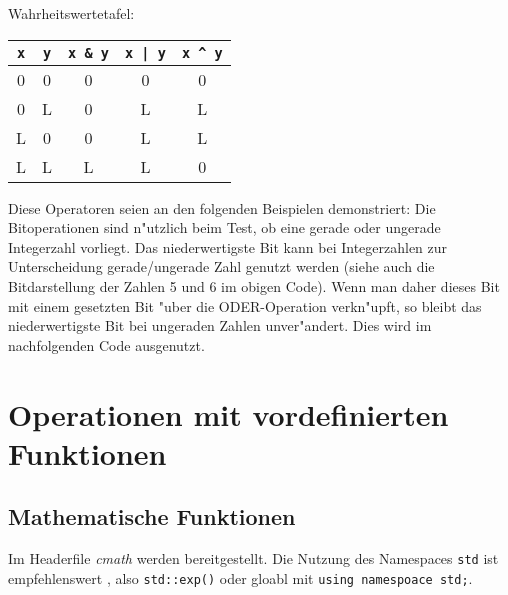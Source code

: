 Wahrheitswertetafel:
\begin{tabular}[t]{c|c||c|c|c}
  \verb|x| & \verb|y| & \verb|x & y| & \verb!x | y! & \verb|x ^ y| \\ \hline
  0 & 0 & 0 & 0 & 0 \\
  0 & L & 0 & L & L \\
  L & 0 & 0 & L & L \\
  L & L & L & L & 0
\end{tabular}

Diese Operatoren seien an den folgenden Beispielen demonstriert:
%
%
Die Bitoperationen sind n"utzlich beim Test, ob eine gerade oder ungerade
Integerzahl vorliegt. Das niederwertigste Bit kann bei Integerzahlen
zur Unterscheidung \glqq{}gerade/ungerade Zahl\grqq{} genutzt werden (siehe auch die
Bitdarstellung der Zahlen 5 und 6 im obigen Code). Wenn man daher
dieses Bit mit einem gesetzten Bit "uber die ODER-Operation verkn"upft, so
bleibt das niederwertigste Bit bei ungeraden Zahlen unver"andert.
Dies wird im nachfolgenden Code ausgenutzt.
%
\pagebreak[1]
%
%
\section{Operationen mit vordefinierten Funktionen}
\label{p:3.6}
\subsection{Mathematische Funktionen}
\label{p:3.6.1}
%
Im Headerfile \textit{cmath} werden  bereitgestellt. 
Die Nutzung des Namespaces \verb|std| ist empfehlenswert , also \verb|std::exp()| oder gloabl mit \verb|using namespoace std;|.


